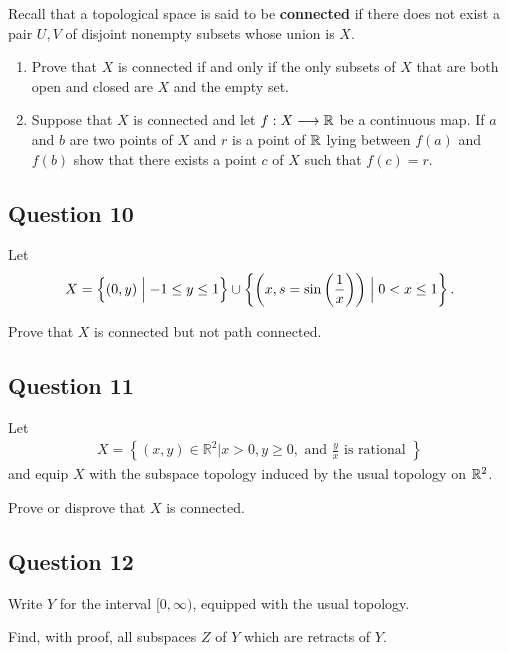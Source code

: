\documentclass[12pt]{article}
\newcommand{\qty}[1]{\left( {#1} \right)}
\begin{document}
Recall that a topological space is said to be \textbf{connected} if
there does not exist a pair \(U, V\) of disjoint nonempty subsets whose
union is \(X\).

\begin{enumerate}
\def\labelenumi{\roman{enumi}.}
\item
  Prove that \(X\) is connected if and only if the only subsets of \(X\)
  that are both open and closed are \(X\) and the empty set.
\item
  Suppose that \(X\) is connected and let \(f : X \longrightarrow {\mathbb{R}}\) be a
  continuous map. If \(a\) and \(b\) are two points of \(X\) and \(r\)
  is a point of \({\mathbb{R}}\) lying between \(f (a)\) and \(f (b)\) show that
  there exists a point \(c\) of \(X\) such that \(f (c) = r\).
\end{enumerate}

\hypertarget{question-10-3}{%
\subsection{Question 10}\label{question-10-3}}

Let \[
X = \theset{(0, y) \mid - 1 \leq y \leq 1} \cup \theset{\qty{x, s = \sin\qty{1 \over x}} \mid 0 < x \leq 1}
.\]

Prove that \(X\) is connected but not path connected.

\hypertarget{question-11-3}{%
\subsection{Question 11}\label{question-11-3}}

Let \begin{align*}
X=\left\{(x, y) \in \mathbb{R}^{2} | x>0, y \geq 0, \text { and } \frac{y}{x} \text { is rational }\right\}
\end{align*} and equip \(X\) with the subspace topology induced by the
usual topology on \({\mathbb{R}}^2\).

Prove or disprove that \(X\) is connected.

\hypertarget{question-12-3}{%
\subsection{Question 12}\label{question-12-3}}

Write \(Y\) for the interval \([0, \infty)\), equipped with the usual
topology.

Find, with proof, all subspaces \(Z\) of \(Y\) which are retracts of
\(Y\).
\end{document}
